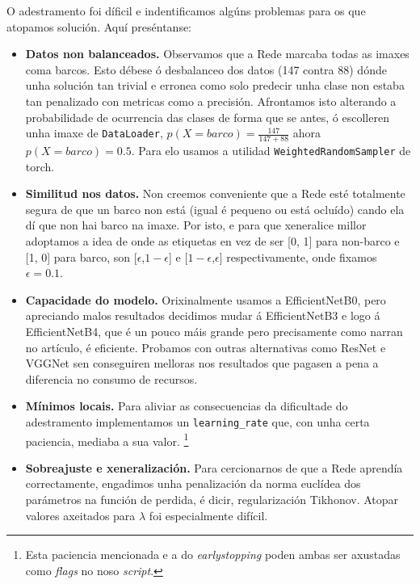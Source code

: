 \documentclass{article}
\begin{document}
O adestramento foi díficil e indentificamos algúns problemas para os que atopamos solución. Aquí preséntanse:
\begin{itemize}
	\item \textbf{Datos non balanceados.} Observamos que a Rede marcaba todas as imaxes coma barcos. Esto débese ó desbalanceo dos datos (147 contra 88) dónde unha solución tan trivial e erronea como solo predecir unha clase non estaba tan penalizado con metricas como a precisión. Afrontamos isto alterando a probabilidade de ocurrencia das clases de forma que se antes, ó escolleren unha imaxe de \texttt{DataLoader}, $p(X=barco) = \frac{147}{147+88}$ ahora $p(X = barco) = 0.5$. Para elo usamos a utilidad \texttt{WeightedRandomSampler} de torch.
	\item \textbf{Similitud nos datos.} Non creemos conveniente que a Rede esté totalmente segura de que un barco non está (igual é pequeno ou está ocluído) cando ela dí que non hai barco na imaxe. Por isto, e para que xeneralice millor adoptamos a idea de \cite{DBLP:journals/corr/SzegedyVISW15} onde as etiquetas en vez de ser [0, 1] para non-barco e [1, 0] para barco, son [$\epsilon$,$1 - \epsilon$] e [$1- \epsilon$,$\epsilon$] respectivamente, onde fixamos $\epsilon = 0.1$.
	\item \textbf{Capacidade do modelo.} Orixinalmente usamos a EfficientNetB0, pero apreciando malos resultados decidimos mudar á EfficientNetB3 e logo á EfficientNetB4, que é un pouco máis grande pero precisamente como narran no artículo, é eficiente. Probamos con outras alternativas como ResNet e VGGNet sen conseguiren melloras nos resultados que pagasen a pena a diferencia no consumo de recursos.
	\item \textbf{Mínimos locais.} Para aliviar as consecuencias da dificultade do adestramento implementamos un \texttt{learning\_rate} que, con unha certa paciencia, mediaba a sua valor. \footnote{Esta paciencia mencionada e a do \emph{earlystopping} poden ambas ser axustadas como \emph{flags} no noso \emph{script}.}
	\item \textbf{Sobreajuste e xeneralización.} Para cercionarnos de que a Rede aprendía correctamente, engadimos unha penalización da norma euclídea dos parámetros na función de perdida, é dicir, regularización Tikhonov. Atopar valores axeitados para $\lambda$ foi especialmente difícil.
\end{itemize}
\end{document}
